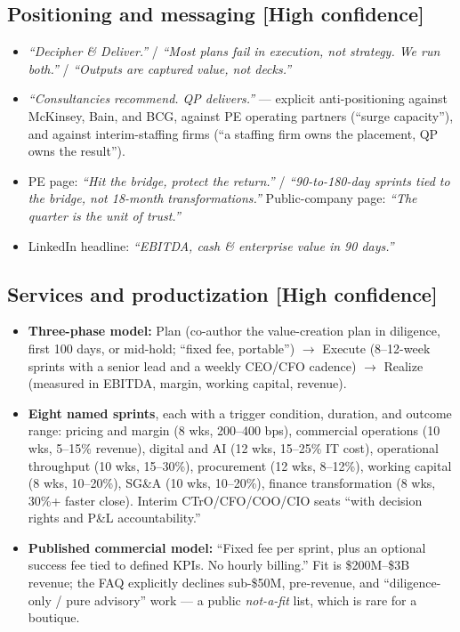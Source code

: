 \documentclass[11pt]{article}
\newcommand{\high}{\textcolor{green!45!black}{\textbf{[High confidence]}}}
\begin{document}
\subsection{Positioning and messaging \high}
\begin{itemize}
  \item \emph{``Decipher \& Deliver.''} / \emph{``Most plans fail in execution, not
  strategy. We run both.''} / \emph{``Outputs are captured value, not decks.''}
  \item \emph{``Consultancies recommend. QP delivers.''} --- explicit anti-positioning
  against McKinsey, Bain, and BCG, against PE operating partners (``surge capacity''),
  and against interim-staffing firms (``a staffing firm owns the placement, QP owns the
  result'').
  \item PE page: \emph{``Hit the bridge, protect the return.''} / \emph{``90-to-180-day
  sprints tied to the bridge, not 18-month transformations.''} Public-company page:
  \emph{``The quarter is the unit of trust.''}
  \item LinkedIn headline: \emph{``EBITDA, cash \& enterprise value in 90 days.''}
\end{itemize}

\subsection{Services and productization \high}
\begin{itemize}
  \item \textbf{Three-phase model:} Plan (co-author the value-creation plan in
  diligence, first 100 days, or mid-hold; ``fixed fee, portable'') $\rightarrow$ Execute
  (8--12-week sprints with a senior lead and a weekly CEO/CFO cadence) $\rightarrow$
  Realize (measured in EBITDA, margin, working capital, revenue).
  \item \textbf{Eight named sprints}, each with a trigger condition, duration, and
  outcome range: pricing and margin (8 wks, 200--400 bps), commercial operations (10
  wks, 5--15\% revenue), digital and AI (12 wks, 15--25\% IT cost), operational
  throughput (10 wks, 15--30\%), procurement (12 wks, 8--12\%), working capital (8 wks,
  10--20\%), SG\&A (10 wks, 10--20\%), finance transformation (8 wks, 30\%+ faster
  close). Interim CTrO/CFO/COO/CIO seats ``with decision rights and P\&L accountability.''
  \item \textbf{Published commercial model:} ``Fixed fee per sprint, plus an optional
  success fee tied to defined KPIs. No hourly billing.'' Fit is \$200M--\$3B revenue;
  the FAQ explicitly declines sub-\$50M, pre-revenue, and ``diligence-only / pure
  advisory'' work --- a public \emph{not-a-fit} list, which is rare for a boutique.
\end{itemize}
\end{document}
